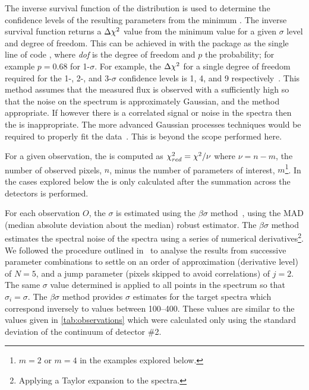 The inverse survival function of the \textchisquared{} distribution is used to determine the confidence levels of the resulting parameters from the minimum \textchisquared{}.
The inverse survival function returns a \(\Delta{\chi}^{2}\) value from the minimum \textchisquared{} value for a given $\sigma$ level and degree of freedom.
This can be achieved in \Python{} with the \scipy{} package as the single line of code , where \textit{dof} is the degree of freedom and \(p\) the probability; for example \(p = 0.68\) for 1-\(\sigma\).
For example, the \(\Delta {\chi}^{2}\) for a single degree of freedom required for the 1-, 2-, and 3-\(\sigma\) confidence levels is 1, 4, and 9 respectively~\citep{bevington_data_2003}.
This method assumes that the measured flux is observed with a \snr{} sufficiently high so that the noise on the spectrum is approximately Gaussian, and the \textchisquared{} method appropriate.
If however there is a correlated signal or noise in the spectra then the \textchisquared{} is inappropriate.
The more advanced Gaussian processes techniques would be required to properly fit the data~\citep[e.g.]{rasmussen_gaussian_2006}.
This is beyond the scope performed here.

For a given observation, the \textchisquaredreduced{} is computed as \({\chi}^{2}_{red}{}={\chi}^{2}{} / \nu\) where \(\nu = n - m\), the number of observed pixels, \(n\), minus the number of parameters of interest, \(m\)\footnote{\(m=2\) or \(m=4\) in the examples explored below.}.
In the cases explored below the \textchisquaredreduced{} is only calculated after the summation across the detectors is performed.

For each observation \(O\), the \(\sigma\) is estimated using the \(\beta\sigma\) method~\citep{czesla_posteriori_2018}, using the {MAD} (median absolute deviation about the median) robust estimator.
The \(\beta\sigma\) method estimates the spectral noise of the spectra using a series of numerical derivatives\footnote{Applying a Taylor expansion to the spectra.}.
We followed the procedure outlined in~\citet{czesla_posteriori_2018} to analyse the results from successive parameter combinations to settle on an order of approximation (derivative level) of \(N=5\), and a jump parameter (pixels skipped to avoid correlations) of \(j=2\).
The same \(\sigma\) value determined is applied to all points in the spectrum so that \({\sigma}_{i} = \sigma\).
The \(\beta\sigma\) method provides \(\sigma\) estimates for the target spectra which correspond inversely to \snr{} values between 100--400.
These \snr{} values are similar to the values given in \cref{tab:observations} which were calculated only using the standard deviation of the continuum of detector \#2.

